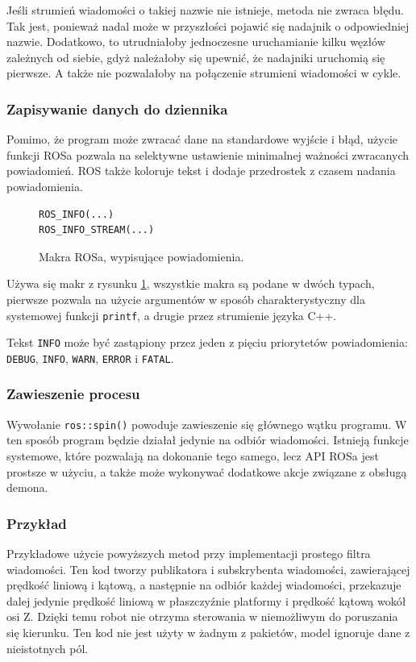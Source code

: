 			Jeśli strumień wiadomości o takiej nazwie nie istnieje, metoda nie zwraca błędu. Tak jest, ponieważ nadal może w przyszłości pojawić się
			nadajnik o odpowiedniej nazwie. Dodatkowo, to utrudniałoby jednoczesne uruchamianie kilku węzłów zależnych od siebie, gdyż należałoby się upewnić, że
			nadajniki uruchomią się pierwsze. A także nie pozwalałoby na połączenie strumieni wiadomości w cykle.
			
		\subsubsection{Zapisywanie danych do dziennika}
			Pomimo, że program może zwracać dane na standardowe wyjście i błąd, użycie funkcji ROSa pozwala na selektywne ustawienie minimalnej ważności zwracanych powiadomień.
			ROS także koloruje tekst i dodaje przedrostek z czasem nadania powiadomienia.
			
			\begin{figure}[h]
			\begin{verbatim}
ROS_INFO(...)
ROS_INFO_STREAM(...)
			\end{verbatim}
			\caption{Makra ROSa, wypisujące powiadomienia.}
			\label{code:ros_logging}
			\end{figure}
			
			Używa się makr z rysunku \ref{code:ros_logging}, wszystkie makra są podane w dwóch typach, pierwsze pozwala na użycie argumentów
			w sposób charakterystyczny dla systemowej funkcji \texttt{printf}, a drugie przez strumienie języka C++.
			
			Tekst \texttt{INFO} może być zastąpiony przez jeden z pięciu priorytetów powiadomienia: \texttt{DEBUG}, \texttt{INFO}, \texttt{WARN}, \texttt{ERROR} i \texttt{FATAL}.
			
		\subsubsection{Zawieszenie procesu}
			Wywołanie \texttt{ros::spin()} powoduje zawieszenie się głównego wątku programu. 
			W ten sposób program będzie działał jedynie na odbiór wiadomości.
			Istnieją funkcje systemowe, które pozwalają na dokonanie tego samego, lecz API ROSa jest prostsze w użyciu, a także może wykonywać dodatkowe akcje
			związane z obsługą demona.
			
		\subsubsection{Przykład}
			Przykładowe użycie powyższych metod przy implementacji prostego filtra wiadomości. 
			Ten kod tworzy publikatora i subskrybenta wiadomości, zawierającej prędkość liniową i kątową, a następnie na odbiór każdej wiadomości,
			przekazuje dalej jedynie prędkość liniową w płaszczyźnie platformy i prędkość kątową wokół osi Z.
			Dzięki temu robot nie otrzyma sterowania w niemożliwym do poruszania się kierunku. Ten kod nie jest użyty w żadnym z pakietów, model 
			ignoruje dane z nieistotnych pól.
			
